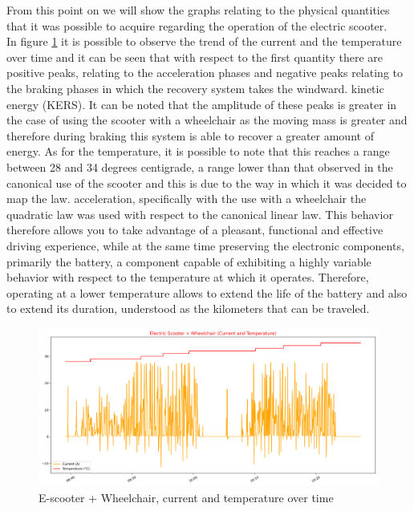 \documentclass[binding=0.6cm,LaM,noexaminfo]{sapthesis}
\begin{document}
\noindent From this point on we will show the graphs relating to the physical quantities that it was possible to acquire regarding the operation of the electric scooter.\\
In figure \ref{fig:1_curr&temp} it is possible to observe the trend of the current and the temperature over time and it can be seen that with respect to the first quantity there are positive peaks, relating to the acceleration phases and negative peaks relating to the braking phases in which the recovery system takes the windward. kinetic energy (KERS). It can be noted that the amplitude of these peaks is greater in the case of using the scooter with a wheelchair as the moving mass is greater and therefore during braking this system is able to recover a greater amount of energy. As for the temperature, it is possible to note that this reaches a range between 28 and 34 degrees centigrade, a range lower than that observed in the canonical use of the scooter and this is due to the way in which it was decided to map the law. acceleration, specifically with the use with a wheelchair the quadratic law was used with respect to the canonical linear law. This behavior therefore allows you to take advantage of a pleasant, functional and effective driving experience, while at the same time preserving the electronic components, primarily the battery, a component capable of exhibiting a highly variable behavior with respect to the temperature at which it operates. Therefore, operating at a lower temperature allows to extend the life of the battery and also to extend its duration, understood as the kilometers that can be traveled.

\begin{figure}[!htp]
    \centering
    \includegraphics[width=.9\textwidth]{images/graphs/1_curr+temp.png}
    \caption{E-scooter + Wheelchair, current and temperature over time}
    \label{fig:1_curr&temp}
\end{figure}
\end{document}
